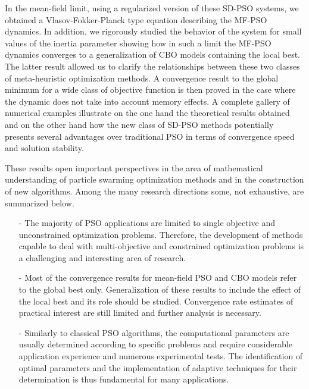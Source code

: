 \documentclass{ims9x6}
\begin{document}
In the mean-field limit, using a regularized version of these SD-PSO systems, we obtained a Vlasov-Fokker-Planck type equation describing the MF-PSO dynamics. In addition, we rigorously studied the behavior of the system for small values of the inertia parameter showing how in such a limit the MF-PSO dynamics converges to a generalization of CBO models containing the local best. The latter result allowed us to clarify the relationships between these two classes of meta-heuristic optimization methods. A convergence result to the global minimum for a wide class of objective function is then proved in the case where the dynamic does not take into account memory effects. 
A complete gallery of numerical examples illustrate on the one hand the theoretical results obtained and on the other hand how the new class of SD-PSO methods potentially presents several advantages over traditional PSO in terms of convergence speed and solution stability. 

These results open important perspectives in the area of mathematical understanding of particle swarming optimization methods and in the construction of new algorithms. Among the many research directions some, not exhaustive, are summarized below.
\begin{enumerate}
\item[-] The majority of PSO applications are limited to single objective and unconstrained optimization problems. Therefore, the development of methods capable to deal with multi-objective and constrained optimization problems is a challenging and interesting area of research.
\smallskip
\item[-] Most of the convergence results for mean-field PSO and CBO models refer to the global best only. Generalization of these results to include the effect of the local best and its role should be studied. Convergence rate estimates of practical interest are still limited and further analysis is necessary.
\smallskip
\item[-] Similarly to classical PSO algorithms, the computational parameters are usually determined according to specific problems and require considerable application experience and numerous experimental tests. The identification of optimal parameters and the implementation of adaptive techniques for their determination is thus fundamental for many applications.
\end{enumerate}
\end{document}
